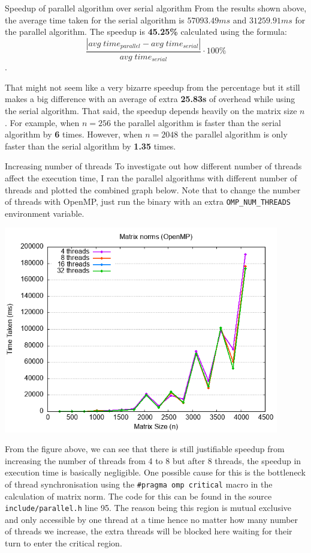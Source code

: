\documentclass[12pt]{article}
\begin{document}
\begin{section}{Speedup of parallel algorithm over serial algorithm}
 From the results shown above, the average time taken for the serial algorithm is $57093.49ms$  and $31259.91ms$ for the parallel algorithm.
 The speedup is \textbf{45.25\%} calculated using the formula: $$\frac{|avg\;time_{parallel} - avg\;time_{serial}|}{avg\;time_{serial}} \cdot 100\%$$.

 That might not seem like a very bizarre speedup from the percentage but it still makes a big difference with an average of extra \textbf{25.83s} of overhead while using the serial algorithm.
 That said, the speedup depends heavily on the matrix size $n$. For example, when $n = 256$ the parallel
 algorithm is faster than the serial algorithm by \textbf{6} times. However, when $n = 2048$ the parallel algorithm is only faster than the serial algorithm by \textbf{1.35} times.
\end{section}

\begin{section}{Increasing number of threads}
 To investigate out how different number of threads affect the execution time, I ran the parallel algorithms with different number of threads and plotted the combined graph below.
 Note that to change the number of threads with OpenMP, just run the binary with an extra \texttt{OMP\_NUM\_THREADS} environment variable.

 \begin{center}
     \includegraphics*[width=12cm]{images/benchmark_combined_openmp.png}
 \end{center}

 From the figure above, we can see that there is still justifiable speedup from increasing the number of threads from 4 to 8 but after 8 threads,
 the speedup in execution time is basically negligible. One possible cause for this
 is the bottleneck of thread synchronisation using the \texttt{\#pragma omp critical} macro in the calculation of matrix norm. The code
 for this can be found in the source \texttt{include/parallel.h} line 95. The reason being this region is mutual exclusive and only accessible
 by one thread at a time hence no matter how many number of threads we increase, the extra threads will be blocked here waiting for their turn
 to enter the critical region.

\end{section}
\end{document}
